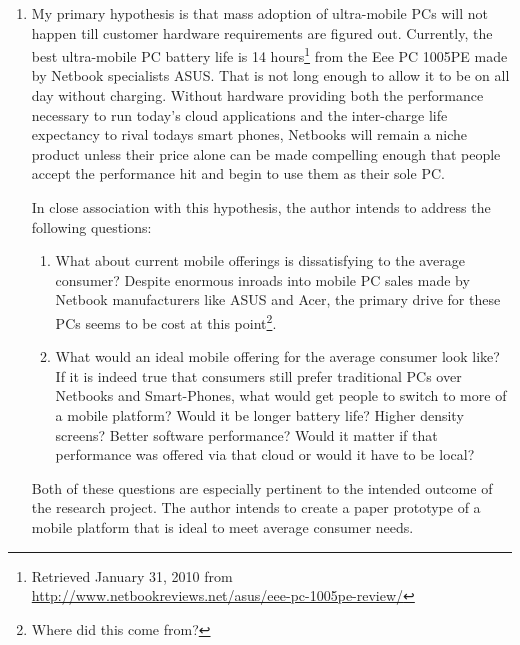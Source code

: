 \begin{enumerate}

\item My primary hypothesis is that mass adoption of ultra-mobile PCs will not
  happen till customer hardware requirements are figured out.  Currently, the
  best ultra-mobile PC battery life is 14 hours\footnote{Retrieved January 31,
    2010 from\\ \url{http://www.netbookreviews.net/asus/eee-pc-1005pe-review/}}
  from the Eee PC 1005PE made by Netbook specialists ASUS.  That is not long
  enough to allow it to be on all day without charging.  Without hardware
  providing both the performance necessary to run today's cloud applications and
  the inter-charge life expectancy to rival todays smart phones, Netbooks will
  remain a niche product unless their price alone can be made compelling enough
  that people accept the performance hit and begin to use them as their sole PC.

  In close association with this hypothesis, the author intends to address the
  following questions:

  \begin{enumerate}

  \item What about current mobile offerings is dissatisfying to the average
    consumer?  Despite enormous inroads into mobile PC sales made by Netbook
    manufacturers like ASUS and Acer, the primary drive for these PCs seems to
    be cost at this point\footnote{Where did this come from?}. %

  \item What would an ideal mobile offering for the average consumer look like?
    If it is indeed true that consumers still prefer traditional PCs over
    Netbooks and Smart-Phones, what would get people to switch to more of a
    mobile platform?  Would it be longer battery life?  Higher density screens?
    Better software performance?  Would it matter if that performance was
    offered via that cloud or would it have to be local?

  \end{enumerate}

  Both of these questions are especially pertinent to the intended outcome of
  the research project.  The author intends to create a paper prototype of a
  mobile platform that is ideal to meet average consumer needs.


\end{enumerate}
